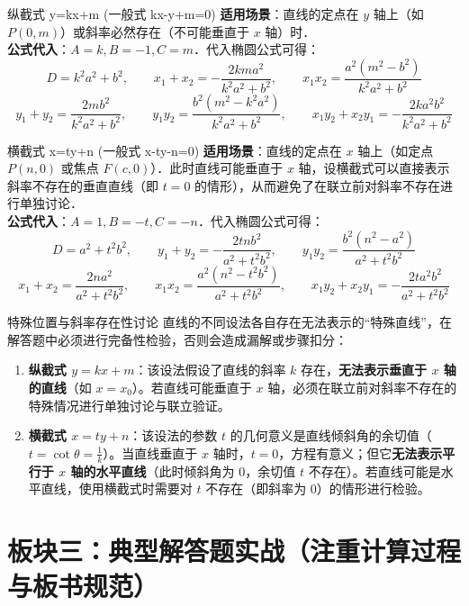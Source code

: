 \documentclass[11pt,a4paper]{ctexart}
\begin{document}
\begin{theorembox}{纵截式 y=kx+m (一般式 kx-y+m=0)}
  \textbf{适用场景}：直线的定点在 $y$ 轴上（如 $P(0, m)$）或斜率必然存在（不可能垂直于 $x$ 轴）时．\\
  \textbf{公式代入}：$A=k, B=-1, C=m$．代入椭圆公式可得：
  \[ D = k^2a^2 + b^2,\qquad x_1 + x_2 = -\frac{2kma^2}{k^2a^2+b^2},\qquad x_1x_2 = \frac{a^2(m^2-b^2)}{k^2a^2+b^2} \]
  \[ y_1 + y_2 = \frac{2mb^2}{k^2a^2+b^2},\qquad y_1y_2 = \frac{b^2(m^2-k^2a^2)}{k^2a^2+b^2},\qquad x_1y_2 + x_2y_1 = -\frac{2ka^2b^2}{k^2a^2+b^2} \]
\end{theorembox}

\begin{theorembox}{横截式 x=ty+n (一般式 x-ty-n=0)}
  \textbf{适用场景}：直线的定点在 $x$ 轴上（如定点 $P(n, 0)$ 或焦点 $F(c, 0)$）．此时直线可能垂直于 $x$ 轴，设横截式可以直接表示斜率不存在的垂直直线（即 $t=0$ 的情形），从而避免了在联立前对斜率不存在进行单独讨论．\\
  \textbf{公式代入}：$A=1, B=-t, C=-n$．代入椭圆公式可得：
  \[ D = a^2 + t^2b^2,\qquad y_1 + y_2 = -\frac{2tnb^2}{a^2+t^2b^2},\qquad y_1y_2 = \frac{b^2(n^2-a^2)}{a^2+t^2b^2} \]
  \[ x_1 + x_2 = \frac{2na^2}{a^2+t^2b^2},\qquad x_1x_2 = \frac{a^2(n^2-t^2b^2)}{a^2+t^2b^2},\qquad x_1y_2 + x_2y_1 = -\frac{2ta^2b^2}{a^2+t^2b^2} \]
\end{theorembox}

\begin{warnbox}{特殊位置与斜率存在性讨论}
  直线的不同设法各自存在无法表示的“特殊直线”，在解答题中必须进行完备性检验，否则会造成漏解或步骤扣分：
  \begin{enumerate}
    \item \textbf{纵截式 $y = kx + m$}：该设法假设了直线的斜率 $k$ 存在，\textbf{无法表示垂直于 $x$ 轴的直线}（如 $x = x_0$）。若直线可能垂直于 $x$ 轴，必须在联立前对斜率不存在的特殊情况进行单独讨论与联立验证。
    \item \textbf{横截式 $x = ty + n$}：该设法的参数 $t$ 的几何意义是直线倾斜角的余切值（$t = \cot\theta = \frac{1}{k}$）。当直线垂直于 $x$ 轴时，$t=0$，方程有意义；但它\textbf{无法表示平行于 $x$ 轴的水平直线}（此时倾斜角为 $0$，余切值 $t$ 不存在）。若直线可能是水平直线，使用横截式时需要对 $t$ 不存在（即斜率为 $0$）的情形进行检验。
  \end{enumerate}
\end{warnbox}

\newpage

\section{板块三：典型解答题实战（注重计算过程与板书规范）}
\end{document}
